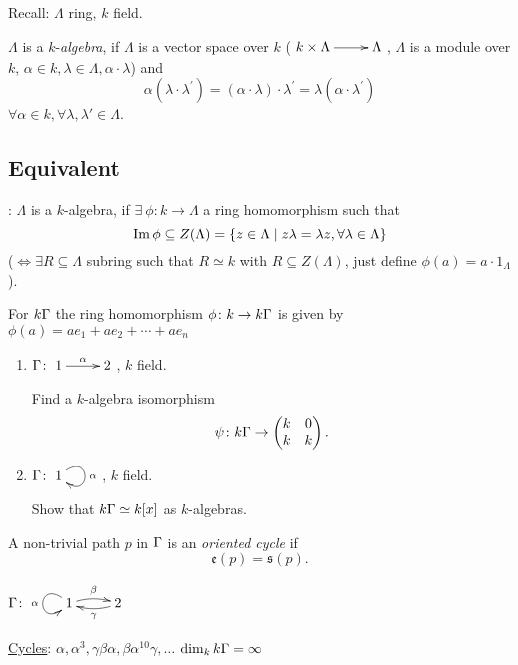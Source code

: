Recall: $\Lambda$ ring, $k$ field. 
\begin{defin}
  $\Lambda$ is a $k$-\emph{algebra}, if $\Lambda$ is a
  vector space over $k$ ($\xymatrix{k\times\Lambda \ar[r] & \Lambda}$,
  $\Lambda$ is a module over $k$,
  $\alpha \in k, \lambda \in \Lambda, \alpha\cdot\lambda$) and
\[\alpha(\lambda\cdot\lambda^{'})=(\alpha\cdot\lambda)\cdot\lambda^{'}
  = \lambda(\alpha\cdot\lambda^{'})\]
  $\forall \alpha \in k, \forall \lambda,
  \lambda'\in\Lambda$. 
	
\subsection*{Equivalent}: $\Lambda$ is a $k$-algebra, if
  $\exists\ \phi\colon k \to \Lambda$ a ring homomorphism such that
 \[\operatorname{Im}\nolimits\phi \subseteq Z(\Lambda)= \{z\in \Lambda \mid 
  z\lambda=\lambda z,\forall \lambda \in \Lambda\}\]
  ($\iff \exists R \subseteq \Lambda$ subring such that $R \simeq k$
  with $R \subseteq Z(\Lambda)$, just define $\phi (a)=a \cdot
  1_{\Lambda}$). 

  For $ k\Gamma $ the ring homomorphism $\phi \colon k \rightarrow k\Gamma $
  is given by $\phi(a) = ae_1 + ae_2 + \cdots + ae_n$
\end{defin}
\begin{exer}
\begin{enumerate}
\item $\Gamma\colon \xymatrix{1\ar[r]^\alpha & 2}$, $k$ field. 

Find a $k$-algebra isomorphism
\[\psi\colon k\Gamma \rightarrow \begin{pmatrix}
    k & 0\\
    k & k
  \end{pmatrix}.\]
\item $\G\colon \xymatrix{1\ar@(ur,dr)[]^\alpha}$,  $k$ field.

Show that $k\Gamma\simeq k[x]$ as $k$-algebras.
\end{enumerate}
\end{exer}

\begin{defin}
  A non-trivial path $p$ in $\Gamma$ is an \emph{oriented
    cycle} if
  \[\mathfrak{e}(p) = \mathfrak{s}(p).\]
\end{defin}

\begin{exam}
  $\G\colon \xymatrix{\ar@(ul,dl)[]_\alpha 1 \ar@/^.3pc/[r]^\beta &
    \ar@/^.3pc/[l]^\gamma 2}$\\ \newline 

\underline{Cycles}:
  $\alpha,\alpha^3,\gamma\beta\alpha,\beta\alpha^{10}\gamma, \ldots$
  $\dim_k k\Gamma = \infty$
\end{exam}

